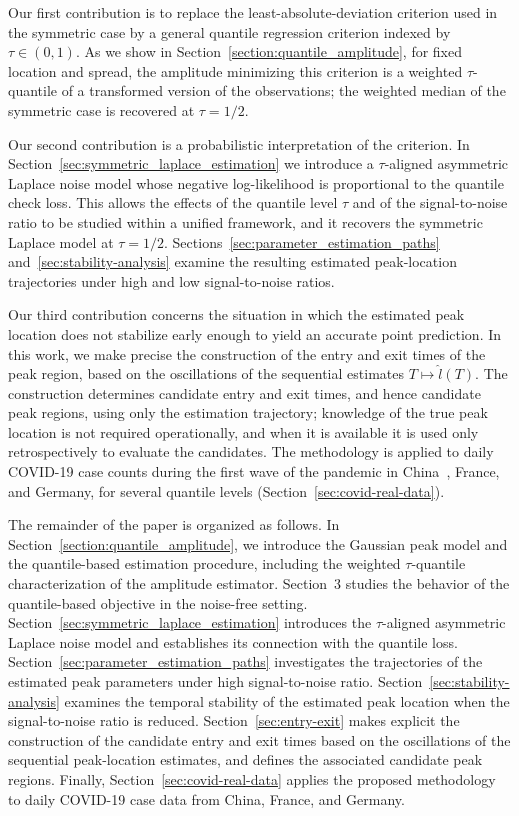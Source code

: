 \documentclass[12pt,a4paper]{article}
\begin{document}
Our first contribution is to replace the least-absolute-deviation
criterion used in the symmetric case by a general quantile regression
criterion indexed by $\tau\in(0,1)$. As we show in
Section~\ref{section:quantile_amplitude}, for fixed location and spread,
the amplitude minimizing this criterion is a weighted $\tau$-quantile of
a transformed version of the observations; the weighted median of the
symmetric case is recovered at $\tau=1/2$.

Our second contribution is a probabilistic interpretation of the
criterion. In Section~\ref{sec:symmetric_laplace_estimation} we
introduce a $\tau$-aligned asymmetric Laplace noise model whose negative
log-likelihood is proportional to the quantile check loss. This allows
the effects of the quantile level $\tau$ and of the signal-to-noise
ratio to be studied within a unified framework, and it recovers the
symmetric Laplace model at $\tau=1/2$.
Sections~\ref{sec:parameter_estimation_paths}
and~\ref{sec:stability-analysis} examine the resulting estimated
peak-location trajectories under high and low signal-to-noise ratios.

Our third contribution concerns the situation in which the estimated peak location does not stabilize early enough to yield an accurate point prediction. In this work, we make precise the construction of the entry and exit times of the peak region, based on the oscillations of the sequential estimates $T\mapsto\hat l(T)$. The construction determines candidate entry and exit times, and hence candidate peak regions, using only the estimation trajectory; knowledge of the true peak location is not required operationally, and when it is available it is used only retrospectively to evaluate the candidates.
The methodology is applied to daily COVID-19 case counts during the
first wave of the pandemic in China~\citep{Bar20}, France, and Germany,
for several quantile levels (Section~\ref{sec:covid-real-data}).

The remainder of the paper is organized as follows. In
Section~\ref{section:quantile_amplitude}, we introduce the Gaussian peak
model and the quantile-based estimation procedure, including the
weighted $\tau$-quantile characterization of the amplitude estimator.
Section~3 studies the behavior of the quantile-based objective in the
noise-free setting. Section~\ref{sec:symmetric_laplace_estimation}
introduces the $\tau$-aligned asymmetric Laplace noise model and
establishes its connection with the quantile loss.
Section~\ref{sec:parameter_estimation_paths} investigates the
trajectories of the estimated peak parameters under high signal-to-noise
ratio. Section~\ref{sec:stability-analysis} examines the temporal stability of the estimated peak location when the signal-to-noise ratio is reduced. Section~\ref{sec:entry-exit} makes explicit the construction of the candidate entry and exit times based on the oscillations of the sequential peak-location estimates, and defines the associated candidate peak regions. Finally, Section~\ref{sec:covid-real-data} applies the proposed methodology to daily COVID-19 case data from China, France, and Germany.
\end{document}
